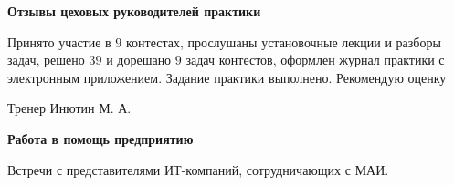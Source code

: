 \begin{center}
\bfseries{\large Отзывы цеховых руководителей практики}
\end{center}

Принято участие в $9$ контестах, прослушаны установочные лекции и разборы задач, решено $39$ и дорешано $9$ задач контестов, оформлен журнал практики с электронным приложением. Задание практики выполнено. Рекомендую оценку

\vspace{15pt}

\hfill Тренер Инютин М. А. 

\vspace{200pt}

\begin{center}
\bfseries{\large Работа в помощь предприятию}
\end{center}

Встречи с представителями ИТ-компаний, сотрудничающих с МАИ.

\pagebreak

